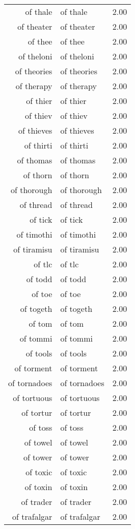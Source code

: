 \begin{table}[ht]
\begin{tabular}{rlr}
  of thale & of thale & 2.00 \\ 
  of theater & of theater & 2.00 \\ 
  of thee & of thee & 2.00 \\ 
  of theloni & of theloni & 2.00 \\ 
  of theories & of theories & 2.00 \\ 
  of therapy & of therapy & 2.00 \\ 
  of thier & of thier & 2.00 \\ 
  of thiev & of thiev & 2.00 \\ 
  of thieves & of thieves & 2.00 \\ 
  of thirti & of thirti & 2.00 \\ 
  of thomas & of thomas & 2.00 \\ 
  of thorn & of thorn & 2.00 \\ 
  of thorough & of thorough & 2.00 \\ 
  of thread & of thread & 2.00 \\ 
  of tick & of tick & 2.00 \\ 
  of timothi & of timothi & 2.00 \\ 
  of tiramisu & of tiramisu & 2.00 \\ 
  of tlc & of tlc & 2.00 \\ 
  of todd & of todd & 2.00 \\ 
  of toe & of toe & 2.00 \\ 
  of togeth & of togeth & 2.00 \\ 
  of tom & of tom & 2.00 \\ 
  of tommi & of tommi & 2.00 \\ 
  of tools & of tools & 2.00 \\ 
  of torment & of torment & 2.00 \\ 
  of tornadoes & of tornadoes & 2.00 \\ 
  of tortuous & of tortuous & 2.00 \\ 
  of tortur & of tortur & 2.00 \\ 
  of toss & of toss & 2.00 \\ 
  of towel & of towel & 2.00 \\ 
  of tower & of tower & 2.00 \\ 
  of toxic & of toxic & 2.00 \\ 
  of toxin & of toxin & 2.00 \\ 
  of trader & of trader & 2.00 \\ 
  of trafalgar & of trafalgar & 2.00 \\ 

\end{tabular}
\end{table}
